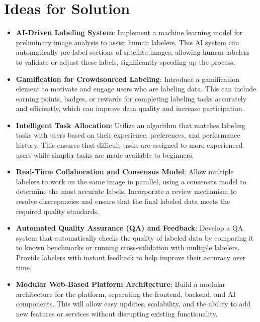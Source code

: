 \documentclass[12pt]{article}
\begin{document}
\section{Ideas for Solution}

\begin{itemize} 
    \item \textbf{AI-Driven Labeling System}: Implement a machine learning model for preliminary image analysis to assist human labelers. This AI system can automatically pre-label sections of satellite images, allowing human labelers to validate or adjust these labels, significantly speeding up the process.
    
    \item \textbf{Gamification for Crowdsourced Labeling}: Introduce a gamification element to motivate and engage users who are labeling data. This can include earning points, badges, or rewards for completing labeling tasks accurately and efficiently, which can improve data quality and increase participation.
    
    \item \textbf{Intelligent Task Allocation}: Utilize an algorithm that matches labeling tasks with users based on their experience, preferences, and performance history. This ensures that difficult tasks are assigned to more experienced users while simpler tasks are made available to beginners.
    
    \item \textbf{Real-Time Collaboration and Consensus Model}: Allow multiple labelers to work on the same image in parallel, using a consensus model to determine the most accurate labels. Incorporate a review mechanism to resolve discrepancies and ensure that the final labeled data meets the required quality standards.
    
    \item \textbf{Automated Quality Assurance (QA) and Feedback}: Develop a QA system that automatically checks the quality of labeled data by comparing it to known benchmarks or running cross-validation with multiple labelers. Provide labelers with instant feedback to help improve their accuracy over time.
    
    \item \textbf{Modular Web-Based Platform Architecture}: Build a modular architecture for the platform, separating the frontend, backend, and AI components. This will allow easy updates, scalability, and the ability to add new features or services without disrupting existing functionality.
    

\end{itemize}
\end{document}

